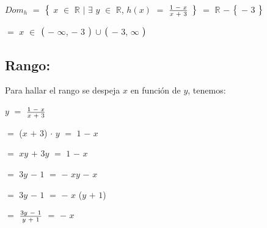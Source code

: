\documentclass[12pt]{article}
\begin{document}
\hspace{1cm} $Dom_{h}$ $=$ $\big{\{}$ $x$ $\in$ $\mathbb{R}$ $\mid$ $\exists$ $y$ $\in$ $\mathbb{R}$,  $h(x)$ $=$ {\LARGE{$\frac{1 \hspace{0.1cm} - \hspace{0.1cm} x}{x \hspace{0.1cm} + \hspace{0.1cm} 3}$}} $\big{\}}$ $=$ $\mathbb{R}$ $-$ $\big{\{}$ $-$ $3$ $\big{\}}$ \vspace{0.5cm}

\hspace{8cm} $=$ $x$ $\in$ $\big{(}$ $-$ $\infty$, $-$ $3$ $\big{)}$ $\cup$ $\big{(}$ $-$ $3$, $\infty$ $\big{)}$  \vspace{0.5cm}

\subsection*{{\textcolor{Lochinvar}{\bfseries{Rango}:}}} Para hallar el rango se despeja $x$ en función de $y$, tenemos: \vspace{0.5cm}

\hspace{4cm} $y$ $=$ {\LARGE{$\frac{1 \hspace{0.1cm} - \hspace{0.1cm} x}{x \hspace{0.1cm} + \hspace{0.1cm} 3}$}} \vspace{0.5cm}

\hspace{4cm} $=$ ($x$ $+$ $3$) $\cdot$ $y$ $=$ $1$ $-$ $x$ \vspace{0.5cm}

\hspace{4cm} $=$ $xy$ $+$ $3y$ $=$ $1$ $-$ $x$ \vspace{0.5cm}

\hspace{4cm} $=$ $3y$ $-$ $1$ $=$ $-$ $xy$ $-$ $x$ \vspace{0.5cm}

\hspace{4cm} $=$ $3y$ $-$ $1$ $=$ $-$ $x$ ($y$ $+$ $1$) \vspace{0.5cm}

\hspace{4cm} $=$ {\LARGE{$\frac{3y \hspace{0.1cm} - \hspace{0.1cm} 1}{y \hspace{0.1cm} + \hspace{0.1cm} 1}$}} $=$ $-$ $x$  \vspace{0.5cm}
\end{document}

